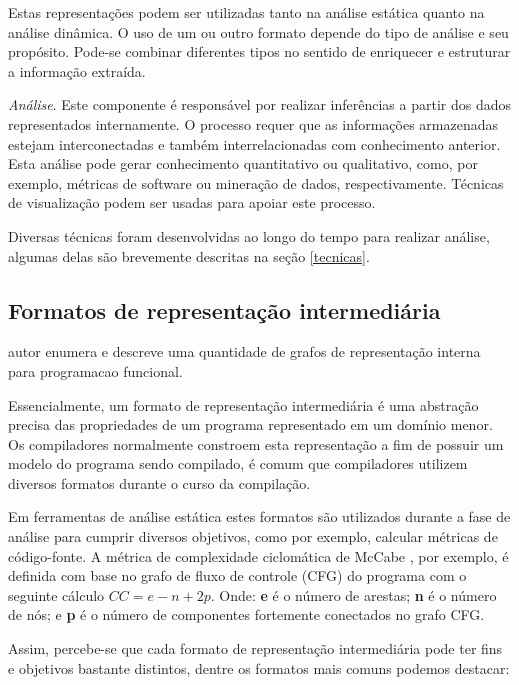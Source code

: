 \begin{description}
    Estas representações podem ser utilizadas tanto na análise estática quanto
    na análise dinâmica. O uso de um ou outro formato depende do tipo de
    análise e seu propósito. Pode-se combinar diferentes tipos no sentido de
    enriquecer e estruturar a informação extraída.

  \item \textit{Análise}.
    Este componente é responsável por realizar inferências a partir dos dados
    representados internamente. O processo requer que as informações
    armazenadas estejam interconectadas e também interrelacionadas com
    conhecimento anterior. Esta análise pode gerar conhecimento quantitativo
    ou qualitativo, como, por exemplo, métricas de software ou mineração de
    dados, respectivamente. Técnicas de visualização podem ser usadas para
    apoiar este processo.

    Diversas técnicas foram desenvolvidas ao longo do tempo para realizar
    análise, algumas delas são brevemente descritas na seção \ref{tecnicas}.

\end{description}

\subsection{Formatos de representação intermediária} \label{formatos}

\cite{Zaytsev2015} autor enumera e descreve uma quantidade de grafos de
representação interna para programacao funcional.

Essencialmente, um formato de representação intermediária é uma abstração precisa
das propriedades de um programa representado em um domínio menor. Os
compiladores normalmente constroem esta representação a fim de possuir um
modelo do programa sendo compilado, é comum que compiladores utilizem diversos
formatos durante o curso da compilação.

Em ferramentas de análise estática estes formatos são utilizados durante a
fase de análise para cumprir diversos objetivos, como por exemplo, calcular
métricas de código-fonte. A métrica de complexidade ciclomática de McCabe
\cite{McCabe1976}, por exemplo, é definida com base no grafo de fluxo de controle (CFG) do
programa com o seguinte cálculo $CC = e - n + 2p$. Onde: {\bf e} é o número de
arestas; {\bf n} é o número de nós; e {\bf p} é o número de componentes
fortemente conectados no grafo CFG.

Assim, percebe-se que cada formato de representação intermediária \cite{Nielson2015}
\cite{Stanier2013} \cite{Cruz2009} \cite{Ramalho1996} pode ter fins e
objetivos bastante distintos, dentre os formatos mais comuns podemos destacar:

